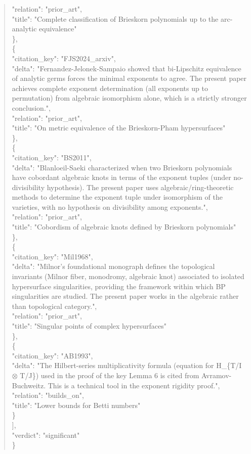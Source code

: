 \documentclass[11pt]{article}
\begin{document}
\begin{quote}
      "relation": "prior\_art",\\
      "title": "Complete classification of Brieskorn polynomials up to the arc-analytic equivalence"\\
    \},\\
    \{\\
      "citation\_key": "FJS2024\_arxiv",\\
      "delta": "Fernandez-Jelonek-Sampaio showed that bi-Lipschitz equivalence of analytic germs forces the minimal exponents to agree. The present paper achieves complete exponent determination (all exponents up to permutation) from algebraic isomorphism alone, which is a strictly stronger conclusion.",\\
      "relation": "prior\_art",\\
      "title": "On metric equivalence of the Brieskorn-Pham hypersurfaces"\\
    \},\\
    \{\\
      "citation\_key": "BS2011",\\
      "delta": "Blanloeil-Saeki characterized when two Brieskorn polynomials have cobordant algebraic knots in terms of the exponent tuples (under no-divisibility hypothesis). The present paper uses algebraic/ring-theoretic methods to determine the exponent tuple under isomorphism of the varieties, with no hypothesis on divisibility among exponents.",\\
      "relation": "prior\_art",\\
      "title": "Cobordism of algebraic knots defined by Brieskorn polynomials"\\
    \},\\
    \{\\
      "citation\_key": "Mil1968",\\
      "delta": "Milnor's foundational monograph defines the topological invariants (Milnor fiber, monodromy, algebraic knot) associated to isolated hypersurface singularities, providing the framework within which BP singularities are studied. The present paper works in the algebraic rather than topological category.",\\
      "relation": "prior\_art",\\
      "title": "Singular points of complex hypersurfaces"\\
    \},\\
    \{\\
      "citation\_key": "AB1993",\\
      "delta": "The Hilbert-series multiplicativity formula (equation for H\_\{T/I \ensuremath{\otimes} T/J\}) used in the proof of the key Lemma 6 is cited from Avramov-Buchweitz. This is a technical tool in the exponent rigidity proof.",\\
      "relation": "builds\_on",\\
      "title": "Lower bounds for Betti numbers"\\
    \}\\
  ],\\
  "verdict": "significant"\\
\}\\
\end{quote}
\end{document}

